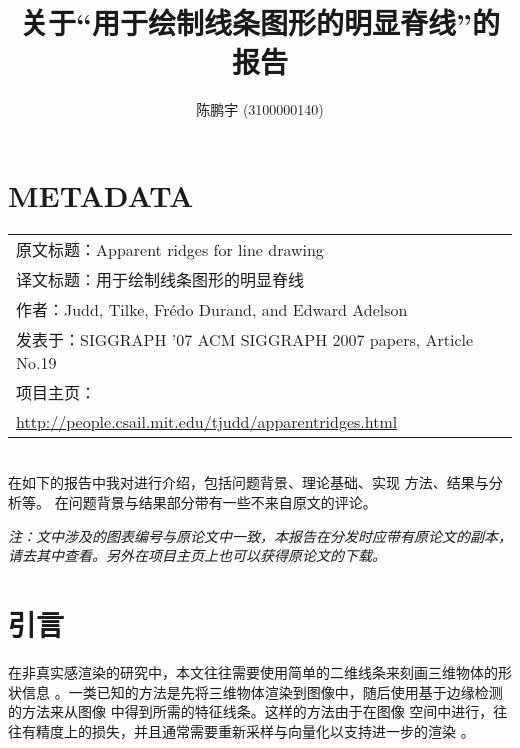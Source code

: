 \documentclass[10pt,a4paper]{article}
\theoremstyle{mythm}%
\numberwithin{equation}{section}
\begin{document}
\setlength{\abovedisplayskip}{1ex} %
\setlength{\belowdisplayskip}{1ex} %
\begin{CJK*}{UTF8}{wqyzh}

\author{陈鹏宇 (3100000140)}                                 %
\title{关于``用于绘制线条图形的明显脊线''的报告}              %
\maketitle                                           %

\section*{METADATA}

\noindent
\begin{tabular}{l}
原文标题：Apparent ridges for line drawing \\
译文标题：用于绘制线条图形的明显脊线 \\
作者：Judd, Tilke, Fr{\'e}do Durand, and Edward Adelson \\
发表于：SIGGRAPH '07 ACM SIGGRAPH 2007 papers, Article No.19 \\
项目主页：\\
\url{http://people.csail.mit.edu/tjudd/apparentridges.html} 
\end{tabular} \\

在如下的报告中我对\cite{Judd:2007:ARLD}进行介绍，包括问题背景、理论基础、实现
方法、结果与分析等。
在问题背景与结果部分带有一些不来自原文的评论。

\emph{注：文中涉及的图表编号与原论文中一致，本报告在分发时应带有原论文的副本，
请去其中查看。另外在项目主页上也可以获得原论文的下载。}


\section{引言}

在非真实感渲染的研究中，本文往往需要使用简单的二维线条来刻画三维物体的形状信息
。一类已知的方法是先将三维物体渲染到图像中，随后使用基于边缘检测的方法来从图像
中得到所需的特征线条\cite{Saito:1990:CRS, Decaudin:1996:CLRS,
Hertzmann:1999:IRSO, Pearson:1985:VCVLDR,Lee:2007:LDAS}。这样的方法由于在图像
空间中进行，往往有精度上的损失，并且通常需要重新采样与向量化以支持进一步的渲染
。


\end{CJK*}
\end{document}
